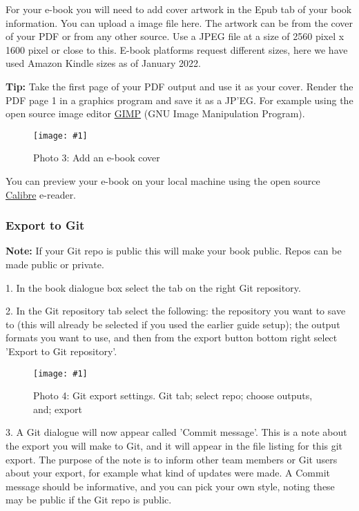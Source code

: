 \documentclass{article}
\newlength{\imgwidth}
\newcommand\scaledgraphics[2]{%
                
\settowidth{\imgwidth}{\texttt{[image: \#1]}}%
                
\setlength{\imgwidth}{\minof{\imgwidth}{#2\textwidth}}%
                
\texttt{[image: \#1]}%
                
}
\begin{document}
For your e-book you will need to add cover artwork in the Epub tab of your book information. You can upload a image file here. The artwork can be from the cover of your PDF or from any other source. Use a JPEG file at a size of 2560 pixel x 1600 pixel or close to this. E-book platforms request different sizes, here we have used Amazon Kindle sizes as of January 2022.


\textbf{Tip:} Take the first page of your PDF output and use it as your cover. Render the PDF page 1 in a graphics program and save it as a JP'EG. For example using the open source image editor \href{https://www.gimp.org/}{GIMP} (GNU Image Manipulation Program).

\begin{figure}
\scaledgraphics{8f163c81-1787-4e57-a8c8-d70fd4930236.png}{1}
\caption*{Photo 3: Add an e-book cover}\label{F2242481}
\end{figure}


You can preview your e-book on your local machine using the open source \href{https://calibre-ebook.com/}{Calibre} e-reader.


\subsubsection{Export to Git}\label{H4535667}



\textbf{Note:} If your Git repo is public this will make your book public. Repos can be made public or private.


1. In the book dialogue box select the tab on the right Git repository.


2. In the Git repository tab select the following: the repository you want to save to (this will already be selected if you used the earlier guide setup); the output formats you want to use, and then from the export button bottom right select 'Export to Git repository'.

\begin{figure}
\scaledgraphics{3936dcb7-7576-45c8-9a91-2340d2e18fb8.png}{1}
\caption*{Photo 4: Git export settings. Git tab; select repo; choose outputs, and; export}\label{F11158451}
\end{figure}


3. A Git dialogue will now appear called 'Commit message'. This is a note about the export you will make to Git, and it will appear in the file listing for this git export. The purpose of the note is to inform other team members or Git users about your export, for example what kind of updates were made. A Commit message should be informative, and you can pick your own style, noting these may be public if the Git repo is public.
\end{document}
